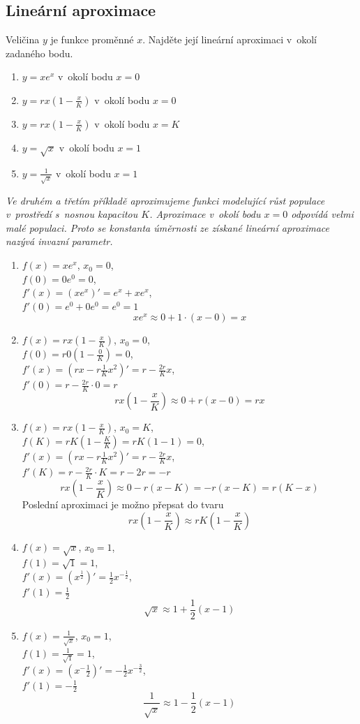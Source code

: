 \konec


\stranka
\subsection{Lineární aproximace} \label{aproximace}Veličina $y$ je funkce proměnné $x$. Najděte její lineární aproximaci v okolí zadaného bodu.
\begin{enumerate}[1)]
   pt
\item $y=xe^x$ v okolí bodu $x=0$
\item $y=rx\left(1-\frac xK\right)$ v okolí bodu $x=0$
\item $y=rx\left(1-\frac xK\right)$ v okolí bodu $x=K$
\item $y=\sqrt x$ v okolí bodu $x=1$
\item $y=\frac 1{\sqrt x}$ v okolí bodu $x=1$
\end{enumerate}

\textit{Ve druhém a třetím příkladě aproximujeme funkci modelující růst
populace v prostředí s nosnou kapacitou $K$. Aproximace v okolí bodu
$x=0$ odpovídá velmi malé populaci. Proto se konstanta úměrnosti ze
získané lineární aproximace nazývá \emph{invazní parametr}.
}


\def\qty(#1){\left(#1\right)}

\reseni

\begin{enumerate}[1)]
\item $f(x)=xe^x$, $x_0=0$,\\ $f(0)=0e^0=0$,\\ $f'(x)=(xe^x)'=e^x+x e^x$,\\ $f'(0)=e^0+0e^0=e^0=1$
  $$xe^x\approx 0+1\cdot (x-0)=x$$
\item $f(x)=rx\qty(1-\frac xK)$, $x_0=0$,\\ $f(0)=r0\qty(1-\frac 0K)=0$,\\ $f'(x)=\qty(rx-r\frac 1K x^2)'=r-\frac{2r}K x$,\\ $f'(0)=r-\frac{2r}{K} \cdot 0=r$
  $$rx\qty(1-\frac xK)\approx 0+r(x-0)=rx$$
\item $f(x)=rx\qty(1-\frac xK)$, $x_0=K$,\\ $f(K)=rK\qty(1-\frac KK)=rK(1-1)=0$,\\ $f'(x)=\qty(rx-r\frac 1K x^2)'=r-\frac{2r}K x$,\\ $f'(K)=r-\frac{2r}{K} \cdot K=r-2r=-r$
  $$rx\qty(1-\frac xK)\approx 0-r(x-K)=-r(x-K)=r(K-x)$$
  Poslední aproximaci je možno přepsat do tvaru
  $$rx\qty(1-\frac xK)\approx  rK\qty(1-\frac xK)$$
\item $f(x)=\sqrt x$, $x_0=1$,\\ $f(1)=\sqrt 1=1$,\\ $f'(x)=\qty(x^{\frac 12})'=\frac 12 x^{-\frac 12}$,\\ $f'(1)=\frac 12$
  $$\sqrt x \approx 1+\frac 12 (x-1)$$
\item $f(x)=\frac 1{\sqrt x}$, $x_0=1$,\\ $f(1)=\frac 1{\sqrt 1}=1$,\\ $f'(x)=\qty(x^{-\frac 12})'=-\frac 12 x^{-\frac 32}$,\\ $f'(1)=-\frac 12$
  $$\frac 1{\sqrt x} \approx 1-\frac 12 (x-1)$$
\end{enumerate}
\konec

